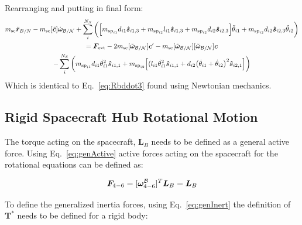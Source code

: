 \documentclass[paper]{aiaaNew}
\begin{document}
Rearranging and putting in final form:
\begin{multline}
m_{\text{sc}} \ddot{\bm r}_{B/N} -m_{\textnormal{sc}} [\tilde{\bm{c}}]\dot{\bm\omega}_{\cal B/N} 
+ \sum\limits_{i}^{N_S} \bigg( \Big[m_{\text{sp}_{i1}} d_{i1} \bm{\hat{s}}_{i1,3} + m_{\text{sp}_{i2}} l_{i1} \bm{\hat{s}}_{i1,3} +m_{\text{sp}_{i2}} d_{i2} \bm{\hat{s}}_{i2,3}\Big] \ddot{\theta}_{i1} 
+ m_{\text{sp}_{i2}}d_{i2} \bm{\hat{s}}_{i2,3} \ddot{\theta}_{i2} \bigg) \\
= \bm F_{\text{ext}} - 2 m_{\textnormal{sc}}[\tilde{\bm\omega}_{\cal B/N}]\bm{c}' - m_{\textnormal{sc}} [\tilde{\bm\omega}_{\cal B/N}][\tilde{\bm\omega}_{\cal B/N}]\bm{c} \\- \sum\limits_{i}^{N_S} \bigg( m_{\text{sp}_{i1}} d_{i1} \dot{\theta}_{i1}^2 \bm{\hat{s}}_{i1,1} + m_{\text{sp}_{i2}} \Big[(l_{i1} \dot{\theta}_{i1}^2 \bm{\hat{s}}_{i1,1} + d_{i2}\big(\dot{\theta}_{i1} + \dot{\theta}_{i2}\big)^2\bm{\hat{s}}_{i2,1} \Big]\bigg)
\end{multline}
Which is identical to Eq.~\eqref{eq:Rbddot3} found using Newtonian mechanics.
\subsection{Rigid Spacecraft Hub Rotational Motion}

The torque acting on the spacecraft, $\bm L_B$ needs to be defined as a general active force. Using Eq.~\eqref{eq:genActive} active forces acting on the spacecraft for the rotational equations can be defined as:

\begin{equation}
\bm F_{4-6} = [\bm \omega_{4-6}^{\cal{B}}]^T \bm L_B = \bm L_B
\end{equation}

To define the generalized inertia forces, using Eq.~\eqref{eq:genInert} the definition of $\bm T^*$ needs to be defined for a rigid body:
\end{document}

